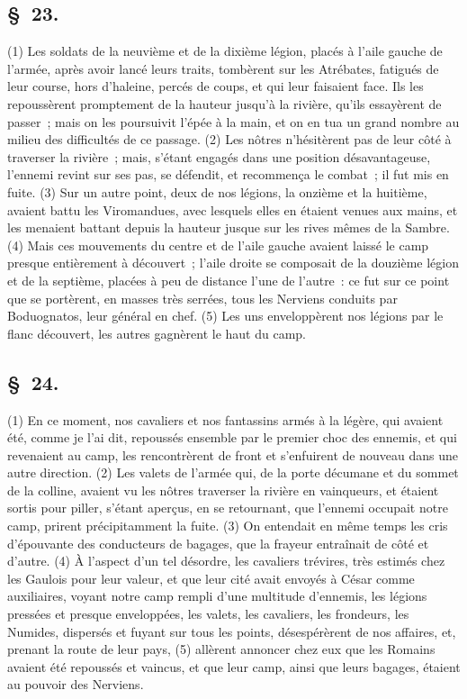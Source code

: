 \documentclass[french,twoside]{book} %
\begin{document}
\subsection[{§ 23.}]{ \textsc{§ 23.} }
\noindent (1) Les soldats de la neuvième et de la dixième légion, placés à l’aile gauche de l’armée, après avoir lancé leurs traits, tombèrent sur les Atrébates, fatigués de leur course, hors d’haleine, percés de coups, et qui leur faisaient face. Ils les repoussèrent promptement de la hauteur jusqu’à la rivière, qu’ils essayèrent de passer ; mais on les poursuivit l’épée à la main, et on en tua un grand nombre au milieu des difficultés de ce passage. (2) Les nôtres n’hésitèrent pas de leur côté à traverser la rivière ; mais, s’étant engagés dans une position désavantageuse, l’ennemi revint sur ses pas, se défendit, et recommença le combat ; il fut mis en fuite. (3) Sur un autre point, deux de nos légions, la onzième et la huitième, avaient battu les Viromandues, avec lesquels elles en étaient venues aux mains, et les menaient battant depuis la hauteur jusque sur les rives mêmes de la Sambre. (4) Mais ces mouvements du centre et de l’aile gauche avaient laissé le camp presque entièrement à découvert ; l’aile droite se composait de la douzième légion et de la septième, placées à peu de distance l’une de l’autre : ce fut sur ce point que se portèrent, en masses très serrées, tous les Nerviens conduits par Boduognatos, leur général en chef. (5) Les uns enveloppèrent nos légions par le flanc découvert, les autres gagnèrent le haut du camp.
\subsection[{§ 24.}]{ \textsc{§ 24.} }
\noindent (1) En ce moment, nos cavaliers et nos fantassins armés à la légère, qui avaient été, comme je l’ai dit, repoussés ensemble par le premier choc des ennemis, et qui revenaient au camp, les rencontrèrent de front et s’enfuirent de nouveau dans une autre direction. (2) Les valets de l’armée qui, de la porte décumane et du sommet de la colline, avaient vu les nôtres traverser la rivière en vainqueurs, et étaient sortis pour piller, s’étant aperçus, en se retournant, que l’ennemi occupait notre camp, prirent précipitamment la fuite. (3) On entendait en même temps les cris d’épouvante des conducteurs de bagages, que la frayeur entraînait de côté et d’autre. (4) À l’aspect d’un tel désordre, les cavaliers trévires, très estimés chez les Gaulois pour leur valeur, et que leur cité avait envoyés à César comme auxiliaires, voyant notre camp rempli d’une multitude d’ennemis, les légions pressées et presque enveloppées, les valets, les cavaliers, les frondeurs, les Numides, dispersés et fuyant sur tous les points, désespérèrent de nos affaires, et, prenant la route de leur pays, (5) allèrent annoncer chez eux que les Romains avaient été repoussés et vaincus, et que leur camp, ainsi que leurs bagages, étaient au pouvoir des Nerviens.
\end{document}
